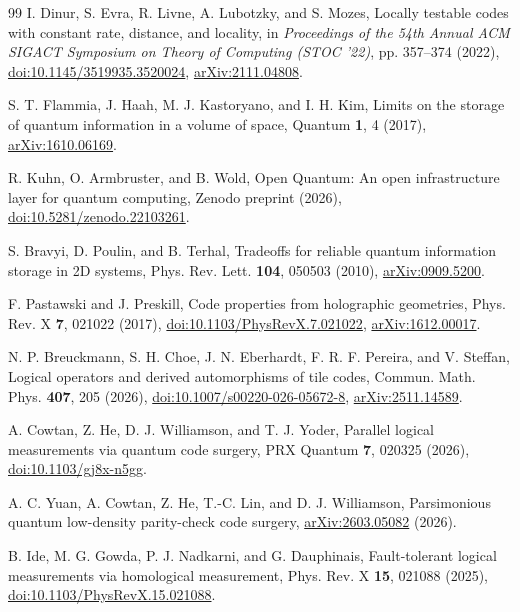 \begin{thebibliography}{99}
I. Dinur, S. Evra, R. Livne, A. Lubotzky, and S. Mozes, Locally testable codes with constant rate, distance, and locality, in \emph{Proceedings of the 54th Annual ACM SIGACT Symposium on Theory of Computing (STOC '22)}, pp. 357--374 (2022), \href{https://doi.org/10.1145/3519935.3520024}{doi:10.1145/3519935.3520024}, \href{https://arxiv.org/abs/2111.04808}{arXiv:2111.04808}.

S. T. Flammia, J. Haah, M. J. Kastoryano, and I. H. Kim, Limits on the storage of quantum information in a volume of space, Quantum \textbf{1}, 4 (2017), \href{https://arxiv.org/abs/1610.06169}{arXiv:1610.06169}.

R. Kuhn, O. Armbruster, and B. Wold, Open Quantum: An open infrastructure layer for quantum computing, Zenodo preprint (2026), \href{https://doi.org/10.5281/zenodo.22103261}{doi:10.5281/zenodo.22103261}.

S. Bravyi, D. Poulin, and B. Terhal, Tradeoffs for reliable quantum information storage in 2D systems, Phys. Rev. Lett. \textbf{104}, 050503 (2010), \href{https://arxiv.org/abs/0909.5200}{arXiv:0909.5200}.

F. Pastawski and J. Preskill, Code properties from holographic geometries, Phys. Rev. X \textbf{7}, 021022 (2017), \href{https://doi.org/10.1103/PhysRevX.7.021022}{doi:10.1103/PhysRevX.7.021022}, \href{https://arxiv.org/abs/1612.00017}{arXiv:1612.00017}.

N. P. Breuckmann, S. H. Choe, J. N. Eberhardt, F. R. F. Pereira, and V. Steffan, Logical operators and derived automorphisms of tile codes, Commun. Math. Phys. \textbf{407}, 205 (2026), \href{https://doi.org/10.1007/s00220-026-05672-8}{doi:10.1007/s00220-026-05672-8}, \href{https://arxiv.org/abs/2511.14589}{arXiv:2511.14589}.

A. Cowtan, Z. He, D. J. Williamson, and T. J. Yoder, Parallel logical measurements via quantum code surgery, PRX Quantum \textbf{7}, 020325 (2026), \href{https://doi.org/10.1103/gj8x-n5gg}{doi:10.1103/gj8x-n5gg}.

A. C. Yuan, A. Cowtan, Z. He, T.-C. Lin, and D. J. Williamson, Parsimonious quantum low-density parity-check code surgery, \href{https://arxiv.org/abs/2603.05082}{arXiv:2603.05082} (2026).

B. Ide, M. G. Gowda, P. J. Nadkarni, and G. Dauphinais, Fault-tolerant logical measurements via homological measurement, Phys. Rev. X \textbf{15}, 021088 (2025), \href{https://doi.org/10.1103/PhysRevX.15.021088}{doi:10.1103/PhysRevX.15.021088}.


\end{thebibliography}
